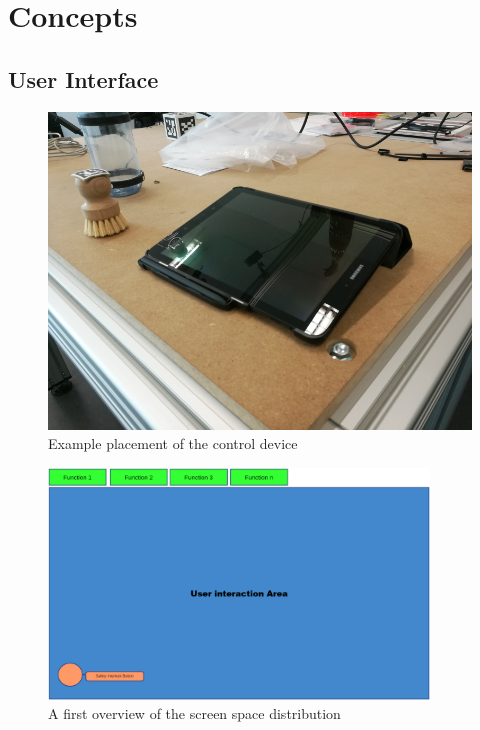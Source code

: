 \chapter{Concepts}
\label{chap:concepts}

\section{User Interface}

\begin{figure}
	\vspace{-2.2em}
	\caption{\label{fig:ui:tablet}Example placement of the control device}
	\includegraphics[width=\linewidth]{assets/chpt_concepts/tablet.png}
\end{figure}

\begin{figure}
	\caption{\label{fig:firstmockup}A first overview of the screen space distribution}
	\includegraphics[width=0.9\textwidth]{assets/chpt_concepts/main_touch_interface.png}
\end{figure}

